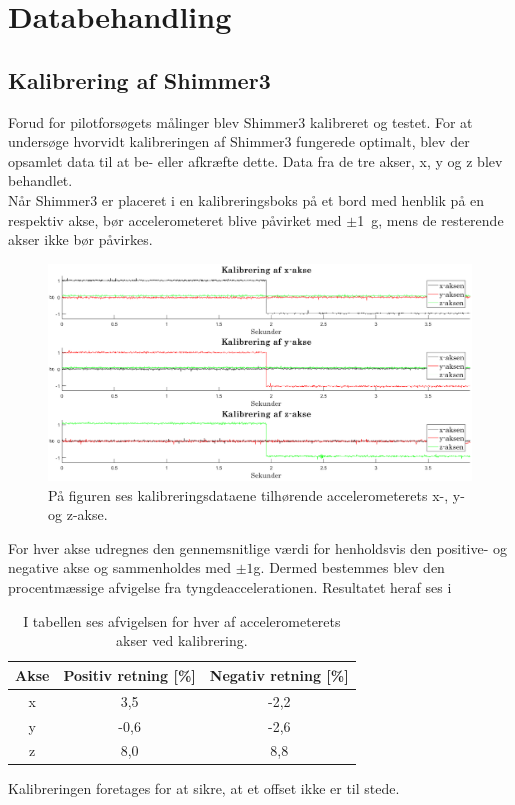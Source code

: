 \section{Databehandling}
\subsection{Kalibrering af Shimmer3}
Forud for pilotforsøgets målinger blev Shimmer3 kalibreret og testet. For at undersøge hvorvidt kalibreringen af Shimmer3 fungerede optimalt, blev der opsamlet data til at be- eller afkræfte dette. Data fra de tre akser, x, y og z blev behandlet. \\
Når Shimmer3 er placeret i en kalibreringsboks på et bord med henblik på en respektiv akse, bør accelerometeret blive påvirket med $\pm$1~g, mens de resterende akser ikke bør påvirkes.
\begin{figure}[H]
	\centering
	\includegraphics[width=1\textwidth]{figures/qBilag/kalibreringsdata}
	\caption{På figuren ses kalibreringsdataene tilhørende accelerometerets x-, y- og z-akse.}
	\label{fig:Ap_Kalibrering}
\end{figure}
For hver akse udregnes den gennemsnitlige værdi for henholdsvis den positive- og negative akse og sammenholdes med $\pm 1$g. Dermed bestemmes blev den procentmæssige afvigelse fra tyngdeaccelerationen. Resultatet heraf ses i 
\begin{table}[H]
	\centering
	\begin{tabular}{ccc}		\hline
		\rowcolor[HTML]{C0C0C0} Akse & Positiv retning {[}\%{]} & Negativ retning {[}\%{]} \\ \hline
		x & 3,5 & -2,2 \\ \hline
		y & -0,6 & -2,6 \\ \hline
		z & 8,0 & 8,8 \\ \hline
	\end{tabular}
	\caption{I tabellen ses afvigelsen for hver af accelerometerets akser ved kalibrering.}
	\label{fig:akser_pilot}
\end{table}\vspace{-.25cm}
Kalibreringen foretages for at sikre, at et offset ikke er til stede. 

